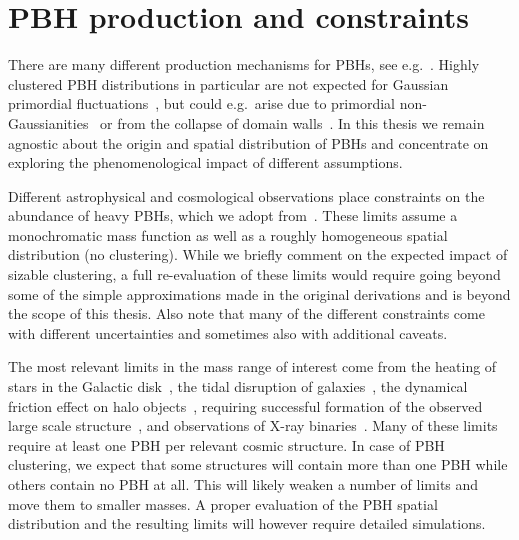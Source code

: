 \section{PBH production and constraints} \label{sec:PBHprod}
There are many different production mechanisms for \acp{PBH}, see e.g.~\cite{Carr:1974nx,Belotsky:2018wph,Cotner:2017tir,Ferrer:2018uiu,Lewicki:2023ioy,Gouttenoire:2023naa,Baker:2021nyl}.   Highly clustered \ac{PBH} distributions in particular are not expected for Gaussian primordial  fluctuations~\cite{Ali-Haimoud:2018dau,Desjacques:2018wuu}, but could e.g.~arise due to primordial non-Gaussianities~\cite{Young:2014oea,Matsubara:2019qzv, Hooper:2023nnl} or from the collapse of domain walls~\cite{Belotsky:2018wph}. In this thesis we remain agnostic about the origin and spatial distribution of \acp{PBH} and concentrate on exploring the phenomenological impact of different assumptions.

Different astrophysical and cosmological observations place constraints on the abundance of heavy \acp{PBH}, which we adopt from~\cite{Carr:2020gox}. These limits assume a monochromatic mass function as well as a roughly homogeneous spatial distribution (no clustering). While we briefly comment on the expected impact of sizable clustering, a full re-evaluation of these limits would require going beyond some of the simple approximations made in the original derivations and is beyond the scope of this thesis. Also note that many of the different constraints come with different uncertainties and sometimes also with additional caveats.

The most relevant limits in the mass range of interest come from the heating of stars in the Galactic disk~\cite{Carr:1997cn}, the tidal disruption of galaxies~\cite{Carr:1997cn}, the dynamical friction effect on halo objects~\cite{Carr:1997cn}, requiring successful formation of the observed large scale structure~\cite{Carr:2018rid}, and  observations of X-ray binaries~\cite{Inoue:2017csr}. Many of these limits require at least one \ac{PBH} per relevant cosmic structure. In case of \ac{PBH} clustering, we expect that some structures will contain more than one \ac{PBH} while others contain no \ac{PBH} at all. This will likely weaken a number of limits and move them to smaller masses. A proper evaluation of the \ac{PBH} spatial distribution and the resulting limits will however require detailed simulations.

